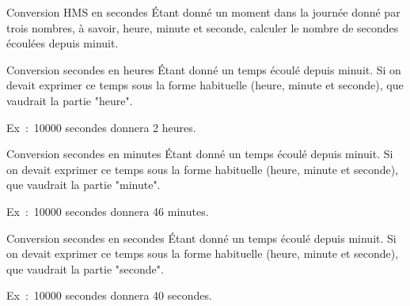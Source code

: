 		\begin{Exercice}{Conversion HMS en secondes}
			Étant donné un moment dans la journée donné
			par trois nombres, à savoir, heure, minute et seconde, calculer le
			nombre de secondes écoulées depuis minuit.
		\end{Exercice}
	
		\begin{Exercice}{Conversion secondes en heures}
			Étant donné un temps écoulé depuis minuit.
			Si on devait exprimer ce temps sous la forme
			habituelle (heure, minute et seconde),
			que vaudrait la partie "heure".
	
			Ex~:~10000 secondes donnera 2 heures.
		\end{Exercice}
	
		\begin{Exercice}{Conversion secondes en minutes}
			Étant donné un temps écoulé depuis minuit.
			Si on devait exprimer ce temps sous la forme
			habituelle (heure, minute et seconde),
			que vaudrait la partie "minute".
	
			Ex~:~10000 secondes donnera 46 minutes.
		\end{Exercice}
	
		\begin{Exercice}{Conversion secondes en secondes}
			Étant donné un temps écoulé depuis minuit.
			Si on devait exprimer ce temps sous la forme
			habituelle (heure, minute et seconde),
			que vaudrait la partie "seconde".
	
			Ex~:~10000 secondes donnera 40 secondes.
		\end{Exercice}	
		
	
